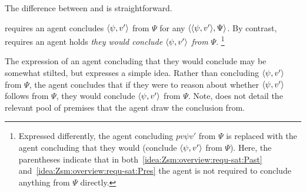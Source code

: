 \begin{note}
  The difference between \izetaS{} and \izetaSm{} is straightforward.

  \izetaS{} requires an agent concludes \(\langle \psi, v' \rangle\) from \(\Psi\) for any \requ{} \(\langle \langle \psi, v' \rangle, \Psi \rangle\).
  By contrast, \izetaSm{} requires an agent holds \emph{they would conclude \(\langle \psi, v' \rangle\) from \(\Psi\)}.%
  \footnote{
    Expressed differently, the agent concluding \(pv{\psi}{v'}\) from \(\Psi\) is replaced with the agent concluding that they would (conclude \(\langle \psi, v' \rangle\) from \(\Psi\)).
    Here, the parentheses indicate that in both~\ref{idea:Zsm:overview:requ-sat:Past} and~\ref{idea:Zsm:overview:requ-sat:Pres} the agent is not required to conclude anything from \(\Psi\) directly.
  }

  The expression of an agent concluding that they would conclude may be somewhat stilted, but expresses a simple idea.
  Rather than concluding \(\langle \psi, v' \rangle\) from \(\Psi\), the agent concludes that if they were to reason about whether \(\langle \psi, v' \rangle\) follows from \(\Psi\), they would conclude \(\langle \psi, v' \rangle\) from \(\Psi\).
  Note, \izetaSm{} does not detail the relevant pool of premises that the agent draw the conclusion from.
\end{note}

